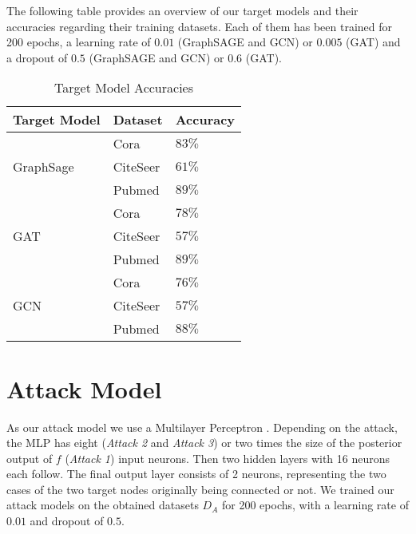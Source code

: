     The following table provides an overview of our target models and their accuracies regarding their training datasets.
    Each of them has been trained for 200 epochs, a learning rate of $0.01$ (GraphSAGE and GCN) or $0.005$ (GAT) and a dropout of $0.5$ (GraphSAGE and GCN) or $0.6$ (GAT).
    \vspace{0.48cm}
    \begin{table}[!h]
      \centering
      \footnotesize
      \begin{tabular}{l|l|l|}
        \toprule
        Target Model & Dataset & Accuracy \\
        \midrule
          \multirow{3}{4em}{GraphSage} & Cora & $83\%$ \\
          & CiteSeer & $61\%$ \\
          & Pubmed & $89\%$ \\

          \multirow{3}{4em}{GAT} & Cora & $78\%$ \\
          & CiteSeer & $57\%$ \\
          & Pubmed & $89\%$ \\

          \multirow{3}{4em}{GCN} & Cora & $76\%$ \\
          & CiteSeer & $57\%$ \\
          & Pubmed & $88\%$ \\
          
        \bottomrule
      \end{tabular}
      \caption{Target Model Accuracies}
      \label{table:target-models}
    \end{table}

  \section{Attack Model}
    As our attack model we use a Multilayer Perceptron .
    Depending on the attack, the MLP has eight (\emph{Attack 2} and \emph{Attack 3}) or two times the size of the posterior output of $f$ (\emph{Attack 1}) input neurons.
    Then two hidden layers with 16 neurons each follow.
    The final output layer consists of 2 neurons, representing the two cases of the two target nodes originally being connected or not.
    We trained our attack models on the obtained datasets $D_A$ for 200 epochs, with a learning rate of $0.01$ and dropout of $0.5$.
